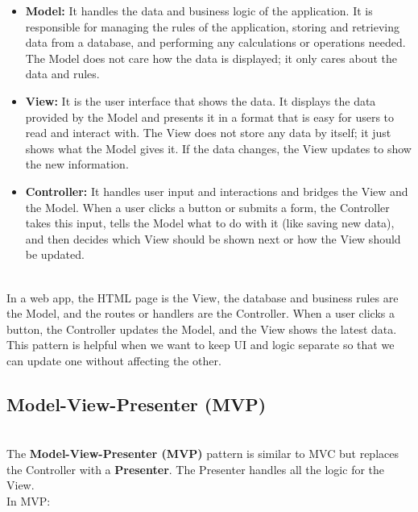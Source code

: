 \begin{itemize}
\item
\protect{}\label{d_ypz1DuwKPtOLZgdIP4p}
\textbf{Model:} It handles the data and business logic of the application. It is responsible for managing the rules of the application, storing and retrieving data from a database, and performing any calculations or operations needed. The Model does not care how the data is displayed; it only cares about the data and rules.
\item
\protect{}\label{ax1Vqsq3BY1rw2E6jjjLP}
\textbf{View:} It is the user interface that shows the data. It displays the data provided by the Model and presents it in a format that is easy for users to read and interact with. The View does not store any data by itself; it just shows what the Model gives it. If the data changes, the View updates to show the new information.
\item
\protect{}\label{DRa1yZTV6Rt1bkCeqHTT0}
\textbf{Controller:} It handles user input and interactions and bridges the View and the Model. When a user clicks a button or submits a form, the Controller takes this input, tells the Model what to do with it (like saving new data), and then decides which View should be shown next or how the View should be updated.
\end{itemize}
\\
In a web app, the HTML page is the View, the database and business rules are the Model, and the routes or handlers are the Controller. When a user clicks a button, the Controller updates the Model, and the View shows the latest data. This pattern is helpful when we want to keep UI and logic separate so that we can update one without affecting the other.

\subsection{Model-View-Presenter (MVP)}\label{FAB-oTFgLdV2dfq6ydHjP}
\\
The \textbf{Model-View-Presenter (MVP)} pattern is similar to MVC but replaces the Controller with a \textbf{Presenter}. The Presenter handles all the logic for the View.
\\
In MVP:

